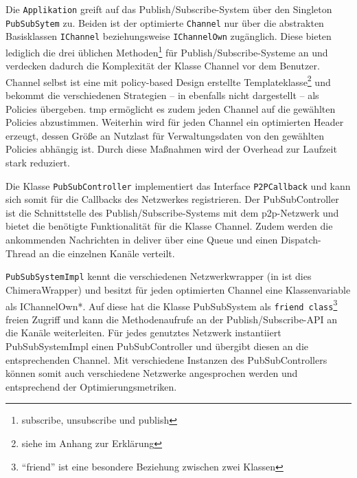 Die \texttt{Applikation} greift auf das Publish/Subscribe-System über den Singleton \texttt{PubSubSytem} zu. Beiden ist der optimierte \texttt{Channel} nur über die abstrakten Basisklassen \texttt{IChannel} beziehungsweise \texttt{IChannelOwn} zugänglich. Diese bieten lediglich die drei üblichen Methoden\footnote{subscribe, unsubscribe und publish} für Publish/Subscribe-Systeme an und verdecken dadurch die Komplexität der Klasse Channel vor dem Benutzer. Channel selbst ist eine mit policy-based Design erstellte Templateklasse\footnote{siehe  im Anhang zur Erklärung} und bekommt die verschiedenen Strategien -- in  ebenfalls nicht dargestellt -- als Policies übergeben. \ac{tmp} ermöglicht es zudem jeden Channel auf die gewählten Policies abzustimmen. Weiterhin wird für jeden Channel ein optimierten Header erzeugt, dessen Größe an Nutzlast für Verwaltungsdaten von den gewählten Policies abhängig ist. Durch diese Maßnahmen wird der Overhead zur Laufzeit stark reduziert. 

Die Klasse \texttt{PubSubController} implementiert das Interface \texttt{P2PCallback} und kann sich somit für die Callbacks des Netzwerkes registrieren. Der PubSubController ist die Schnittstelle des Publish/Subscribe-Systems mit dem \ac{p2p}-Netzwerk und bietet die benötigte Funktionalität für die Klasse Channel. Zudem werden die ankommenden Nachrichten in deliver über eine Queue und einen Dispatch-Thread an die einzelnen Kanäle verteilt. 

\texttt{PubSubSystemImpl} kennt die verschiedenen Netzwerkwrapper (in  ist dies ChimeraWrapper) und besitzt für jeden optimierten Channel eine Klassenvariable als IChannelOwn*. Auf diese hat die Klasse PubSubSystem als \texttt{friend class}\footnote{``friend'' ist eine besondere Beziehung zwischen zwei Klassen} freien Zugriff und kann die Methodenaufrufe an der Publish/Subscribe-API an die Kanäle weiterleiten. Für jedes genutztes Netzwerk instantiiert PubSubSystemImpl einen PubSubController und übergibt diesen an die entsprechenden Channel. Mit verschiedene Instanzen des PubSubControllers können somit auch verschiedene Netzwerke angesprochen werden und entsprechend der Optimierungsmetriken.\\

